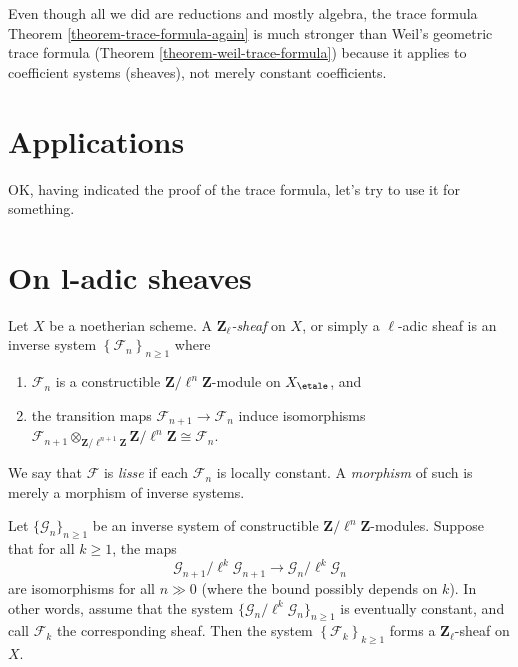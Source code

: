 \begin{remark}
\label{remark-stronger}
Even though all we did are reductions and mostly algebra, the trace formula
Theorem \ref{theorem-trace-formula-again} is much stronger than
Weil's geometric trace formula (Theorem \ref{theorem-weil-trace-formula})
because it applies to coefficient
systems (sheaves), not merely constant coefficients.
\end{remark}


\section{Applications}
\label{section-applications}

\noindent
OK, having indicated the proof of the trace formula, let's try to use it
for something.





\section{On l-adic sheaves}
\label{section-l-adic-sheaves}

\begin{definition}
\label{definition-l-adic-sheaf}
Let $X$ be a noetherian scheme. A
{\it $\mathbf{Z}_\ell$-sheaf} on $X$, or simply a
{$\ell$-adic sheaf} is an
inverse system $\left\{\mathcal{F}_n\right\}_{n\geq 1}$ where
\begin{enumerate}
\item
$\mathcal{F}_n$ is a constructible $\mathbf{Z}/\ell^n\mathbf{Z}$-module on
$X_\etale$, and
\item
the transition maps $\mathcal{F}_{n+1}\to \mathcal{F}_n$ induce isomorphisms
$\mathcal{F}_{n+1} \otimes_{\mathbf{Z}/\ell^{n+1}\mathbf{Z}}
\mathbf{Z}/\ell^n\mathbf{Z} \cong \mathcal{F}_n$.
\end{enumerate}
We say that $\mathcal{F}$ is {\it lisse} if each $\mathcal{F}_n$ is locally
constant. A {\it morphism} of such is merely a morphism of inverse systems.
\end{definition}

\begin{lemma}
\label{lemma-eventually-constant}
Let $\{\mathcal{G}_n\}_{n\geq 1}$ be an inverse system of constructible
$\mathbf{Z}/\ell^n\mathbf{Z}$-modules.
Suppose that for all $k\geq 1$, the maps
$$
\mathcal{G}_{n+1}/\ell^k \mathcal{G}_{n+1}\to \mathcal{G}_n /\ell^k
\mathcal{G}_n
$$
are isomorphisms for all $n\gg 0$ (where the bound possibly depends on $k$).
In other words, assume that the system
$\{\mathcal{G}_n/\ell^k\mathcal{G}_n\}_{n\geq 1}$
is eventually constant, and call $\mathcal{F}_k$ the corresponding sheaf.
Then the system $\left\{\mathcal{F}_k\right\}_{k\geq 1}$ forms a
$\mathbf{Z}_\ell$-sheaf on $X$.
\end{lemma}

